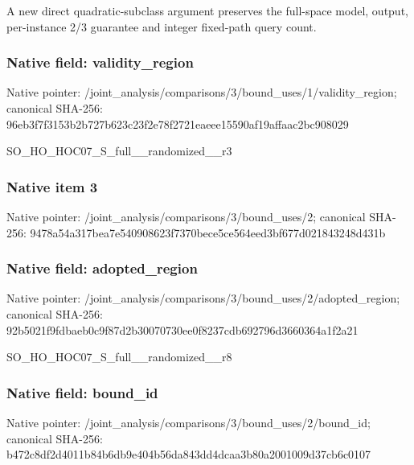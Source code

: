 \documentclass[10pt,a4paper]{article}
\begin{document}
\begingroup\raggedright\sloppy A new direct quadratic-subclass argument preserves the full-space model,\allowbreak{} output,\allowbreak{} per-instance 2/\allowbreak{}3 guarantee and integer fixed-path query count.\par\endgroup

\subsubsection{Native field: validity\_\allowbreak{}region}
Native pointer: /joint\_\allowbreak{}analysis/comparisons/3/bound\_\allowbreak{}uses/1/validity\_\allowbreak{}region; canonical SHA-256: 96eb3f7f3153b2b727b623c23f2e78f2721eaeee15590af19affaac2bc908029

\begingroup\raggedright\sloppy SO\_\allowbreak{}HO\_\allowbreak{}HOC07\_\allowbreak{}S\_\allowbreak{}full\_\allowbreak{}\_\allowbreak{}randomized\_\allowbreak{}\_\allowbreak{}r3\par\endgroup

\subsubsection{Native item 3}
Native pointer: /joint\_\allowbreak{}analysis/comparisons/3/bound\_\allowbreak{}uses/2; canonical SHA-256: 9478a54a317bea7e540908623f7370bece5ce564eed3bf677d021843248d431b

\subsubsection{Native field: adopted\_\allowbreak{}region}
Native pointer: /joint\_\allowbreak{}analysis/comparisons/3/bound\_\allowbreak{}uses/2/adopted\_\allowbreak{}region; canonical SHA-256: 92b5021f9fdbaeb0c9f87d2b30070730ee0f8237cdb692796d3660364a1f2a21

\begingroup\raggedright\sloppy SO\_\allowbreak{}HO\_\allowbreak{}HOC07\_\allowbreak{}S\_\allowbreak{}full\_\allowbreak{}\_\allowbreak{}randomized\_\allowbreak{}\_\allowbreak{}r8\par\endgroup

\subsubsection{Native field: bound\_\allowbreak{}id}
Native pointer: /joint\_\allowbreak{}analysis/comparisons/3/bound\_\allowbreak{}uses/2/bound\_\allowbreak{}id; canonical SHA-256: b472c8df2d4011b84b6db9e404b56da843dd4dcaa3b80a2001009d37cb6c0107
\end{document}
